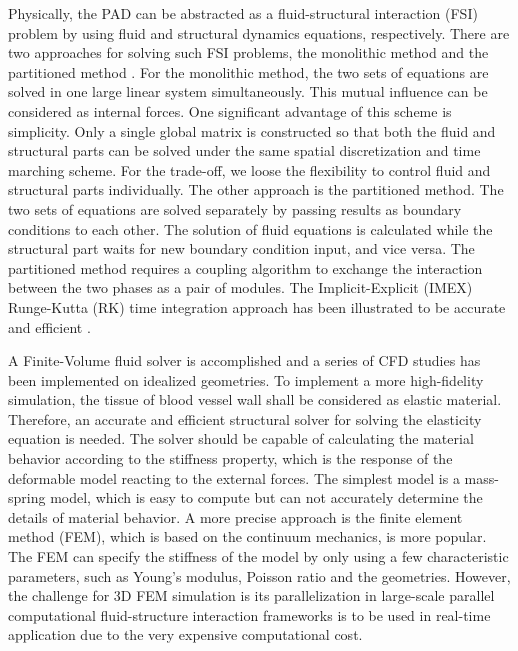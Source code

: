 Physically, the PAD can be abstracted as a fluid-structural interaction (FSI) problem by using fluid and structural dynamics equations, respectively.  There are two approaches for solving such FSI problems, the monolithic method \cite{hubner2004monolithic, degroote2009performance} and the partitioned method \cite{kuttler2008fixed, vierendeels2007implicit}. For the monolithic method, the two sets of equations are solved in one large linear system simultaneously. This mutual influence can be considered as internal forces. One significant advantage of this scheme is simplicity. Only a single global matrix is constructed so that both the fluid and structural parts can be solved under the same spatial discretization and time marching scheme. For the trade-off, we loose the flexibility to control fluid and structural parts individually. The other approach is the partitioned method. The two sets of equations are solved separately by passing results as boundary conditions to each other. The solution of fluid equations is calculated while the structural part waits for new boundary condition input, and vice versa. The partitioned method requires a coupling algorithm to exchange the interaction between the two phases as a pair of modules. The Implicit-Explicit (IMEX) Runge-Kutta (RK) time integration approach has been illustrated to be accurate and efficient \cite{zhang2016high}.

A Finite-Volume fluid solver \cite{liang2007large, liang2007large1, liang2009effect} is accomplished and a series of CFD studies has been implemented on idealized geometries. To implement a more high-fidelity simulation, the tissue of blood vessel wall shall be considered as elastic material. Therefore, an accurate and efficient structural solver for solving the elasticity equation is needed. The solver should be capable of calculating the material behavior according to the stiffness property, which is the response of the deformable model reacting to the external forces. The simplest model is a mass-spring model, which is easy to compute but can not accurately determine the details of material behavior. A more precise approach is the finite element method (FEM), which is based on the continuum mechanics, is more popular. The FEM can specify the stiffness of the model by only using a few characteristic parameters, such as Young's modulus, Poisson ratio and the geometries. However, the challenge for 3D FEM simulation is its parallelization in large-scale parallel computational fluid-structure interaction frameworks is to be used in real-time application due to the very expensive computational cost. 

